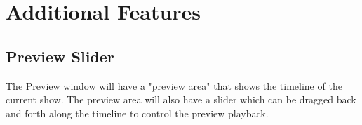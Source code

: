 \documentclass{article}
\begin{document}
\section{Additional Features}
	\subsection{Preview Slider} The Preview window will have a "preview area" that shows the timeline of the current show. The preview area will also have a slider which can be dragged back and forth along the timeline to control the preview playback.
\end{document}
